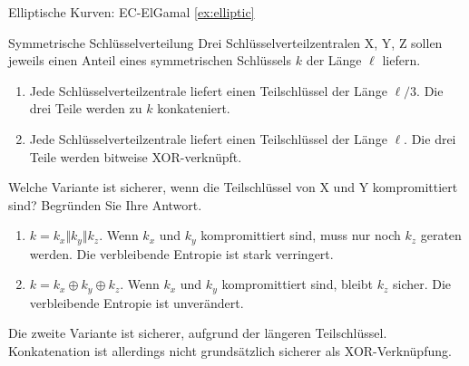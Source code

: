 \documentclass{article}
\begin{document}
\begin{exercise}{Elliptische Kurven: EC-ElGamal \ref{ex:elliptic}}\end{exercise}


\setcounter{subsection}{70}
\begin{exercise}{Symmetrische Schlüsselverteilung}
  Drei Schlüsselverteilzentralen X, Y, Z sollen jeweils einen Anteil eines symmetrischen Schlüssels $k$ der Länge $\ell$ liefern.
  \begin{enumerate}
    \item Jede Schlüsselverteilzentrale liefert einen Teilschlüssel der Länge $\ell/3$. Die drei Teile werden zu $k$ konkateniert.
    \item Jede Schlüsselverteilzentrale liefert einen Teilschlüssel der Länge $\ell$. Die drei Teile werden bitweise XOR-verknüpft.
  \end{enumerate}
  Welche Variante ist sicherer, wenn die Teilschlüssel von X und Y kompromittiert sind? Begründen Sie Ihre Antwort.

  \begin{solution}
    \begin{enumerate}
      \item $k=k_x \Vert k_y \Vert k_z$. Wenn $k_x$ und $k_y$ kompromittiert sind, muss nur noch $k_z$ geraten werden. Die verbleibende Entropie ist stark verringert.
      \item $k=k_x \oplus k_y \oplus k_z$. Wenn $k_x$ und $k_y$ kompromittiert sind, bleibt $k_z$ sicher. Die verbleibende Entropie ist unverändert.
    \end{enumerate}
    Die zweite Variante ist sicherer, aufgrund der längeren Teilschlüssel. Konkatenation ist allerdings nicht grundsätzlich sicherer als XOR-Verknüpfung.
  \end{solution}
\end{exercise}
\end{document}
